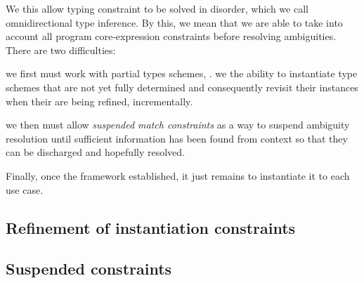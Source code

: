 \documentclass[acmsmall,screen,nonacm]{acmart}
\begin{document}
We this allow typing constraint to be solved in disorder, which we call
omnidirectional type inference. By this, we mean that we are able to take
into account all program core-expression constraints before resolving
ambiguities.  There are two difficulties:
\begin{enumerate*}
\item
  we first must work with partial types schemes, \ie. we the ability
  to instantiate type schemes that are not yet fully determined and
  consequently revisit their instances when their are being refined,
  incrementally.
\item
  we then must allow \emph{suspended match constraints} as a way to suspend ambiguity
  resolution until sufficient information has been found from context so
  that they can be discharged and hopefully resolved.

\end{enumerate*}
Finally, once the framework established, it just remains to instantiate it
to each use case.


\subsection {Refinement of instantiation constraints}

\subsection {Suspended constraints} 


\end{document}
